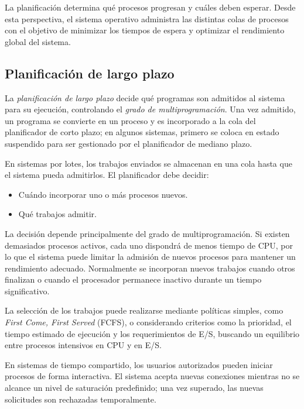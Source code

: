 La planificación determina qué procesos progresan y cuáles deben esperar. Desde esta perspectiva, el sistema operativo administra las distintas colas de procesos con el objetivo de minimizar los tiempos de espera y optimizar el rendimiento global del sistema.

\subsection{Planificación de largo plazo}

La \textit{planificación de largo plazo} decide qué programas son admitidos al sistema para su ejecución, controlando el \textit{grado de multiprogramación}. Una vez admitido, un programa se convierte en un proceso y es incorporado a la cola del planificador de corto plazo; en algunos sistemas, primero se coloca en estado suspendido para ser gestionado por el planificador de mediano plazo.

En sistemas por lotes, los trabajos enviados se almacenan en una cola hasta que el sistema pueda admitirlos. El planificador debe decidir:
\begin{itemize}
  \item Cuándo incorporar uno o más procesos nuevos.
  \item Qué trabajos admitir.
\end{itemize}

La decisión depende principalmente del grado de multiprogramación. Si existen demasiados procesos activos, cada uno dispondrá de menos tiempo de CPU, por lo que el sistema puede limitar la admisión de nuevos procesos para mantener un rendimiento adecuado. Normalmente se incorporan nuevos trabajos cuando otros finalizan o cuando el procesador permanece inactivo durante un tiempo significativo.

La selección de los trabajos puede realizarse mediante políticas simples, como \textit{First Come, First Served} (FCFS), o considerando criterios como la prioridad, el tiempo estimado de ejecución y los requerimientos de E/S, buscando un equilibrio entre procesos intensivos en CPU y en E/S.

En sistemas de tiempo compartido, los usuarios autorizados pueden iniciar procesos de forma interactiva. El sistema acepta nuevas conexiones mientras no se alcance un nivel de saturación predefinido; una vez superado, las nuevas solicitudes son rechazadas temporalmente.

